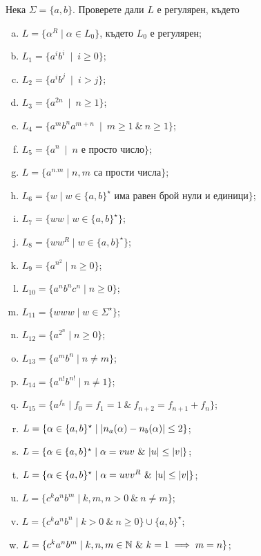 \begin{problem}
  Нека $\Sigma = \{a,b\}$.  Проверете дали $L$ е регулярен, където
  \begin{enumerate}[a)]
  \item
    $L = \{\alpha^R \mid \alpha \in L_0\}$, където $L_0$ е регулярен;
  \item
    $L_1 = \{a^ib^i\ \mid\ i\geq 0\}$;
  \item
    $L_2 = \{a^ib^j\ \mid\ i > j\}$;
  \item
    $L_3 = \{a^{2n}\ \mid\ n\geq 1\}$;
  \item
    $L_4 = \{a^mb^na^{m+n}\ \mid\ m\geq 1\ \&\ n\geq 1\}$;
  \item
    $L_5 = \{a^n\ \mid\ n\mbox{ е просто число}\}$;
  \item
    $L = \{a^{n.m}\mid n,m\mbox{ са прости числа}\}$;
  \item
    $L_6 = \{w\mid w\in\{a,b\}^\star\mbox{ има равен брой нули и единици}\}$;
  \item
    $L_7 = \{ww\mid w\in\{a,b\}^\star\}$;
  \item
    $L_8 = \{ww^R\mid w\in\{a,b\}^\star\}$;
  \item
    $L_9= \{a^{n^2}\mid n\geq 0\}$;
  \item
    $L_{10} = \{a^nb^nc^n\mid n\geq 0\}$;
  \item
    $L_{11} = \{www\mid w\in \Sigma^\star\}$;
  \item
    $L_{12} = \{a^{2^n}\mid n\geq 0\}$;
  \item
    $L_{13} = \{a^mb^n\mid n\neq m\}$;
  \item
    $L_{14} = \{a^{n!}b^{n!}\mid n\neq 1\}$;
  \item
    $L_{15} = \{a^{f_n} \mid f_0 = f_1 = 1\ \&\ f_{n+2} = f_{n+1} + f_{n}\}$;
  \item
    $L = \{\alpha \in \{a,b\}^\star \mid \vert{n_a(\alpha) - n_b(\alpha)}\vert \leq 2\}$;
  \item
    $L = \{\alpha \in \{a,b\}^\star \mid \alpha = vuv\ \&\ \vert{u}\vert \leq \vert{v}\vert\}$;
  \item
    $L = \{\alpha \in \{a,b\}^\star \mid \alpha = uvv^R\ \&\ \vert{u}\vert \leq \vert{v}\vert\}$;
  \item
    $L = \{c^ka^nb^m \mid k,m,n > 0\ \&\ n \neq m\}$;
  \item
    $L = \{c^ka^nb^n \mid k > 0\ \&\ n \geq 0\}\cup\{a,b\}^\star$;
  \item
    $L = \{c^ka^nb^m\mid k,n,m \in \Nat\ \&\ k = 1\implies m = n\}$; %
  \end{enumerate}
\end{problem}

